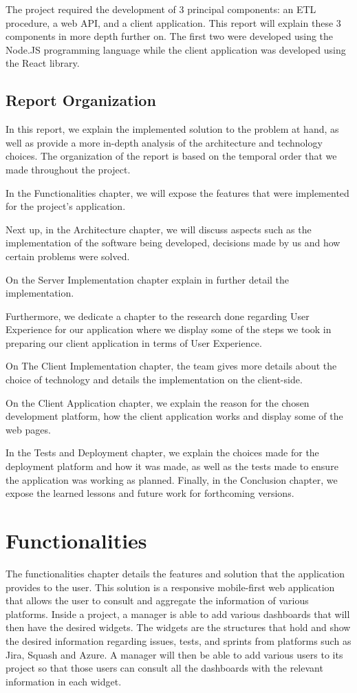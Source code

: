 \documentclass[a4paper,twoside,10pt]{report}
\begin{document}
The project required the development of 3 principal components: an ETL procedure, a web API, and a client application. This report will explain these 3 components in more depth further on.
The first two were developed using the Node.JS programming language while the client application was developed using the React library.

\section{Report Organization}
In this report, we explain the implemented solution to the problem at hand, as well as provide a more in-depth analysis of the architecture and technology choices. The organization of the report is based on the temporal order that we made throughout the project.

In the Functionalities chapter, we will expose the features that were implemented for the project's application.

Next up, in the Architecture chapter, we will discuss aspects such as the implementation of the software being developed, decisions made by us and how certain problems were solved.

On the Server Implementation chapter explain in further detail the implementation.

Furthermore, we dedicate a chapter to the research done regarding User Experience for our application where we display some of the steps we took in preparing our client application in terms of User Experience.

On The Client Implementation chapter, the team gives more details about the choice of technology and details the implementation on the client-side.

On the Client Application chapter, we explain the reason for the chosen development platform, how the client application works and display some of the web pages.  

In the Tests and Deployment chapter, we explain the choices made for the deployment platform and how it was made, as well as the tests made to ensure the application was working as planned. Finally, in the Conclusion chapter, we expose the learned lessons and future work for forthcoming versions.

\chapter{Functionalities}

The functionalities chapter details the features and solution that the application provides to the user. This solution is a responsive mobile-first web application that allows the user to consult and aggregate the information of various platforms. Inside a project, a manager is able to add various dashboards that will then have the desired widgets. The widgets are the structures that hold and show the desired information regarding issues, tests, and sprints from platforms such as Jira\cite{JIRA}, Squash\cite{SQUASH} and Azure\cite{AZURE}. A manager will then be able to add various users to its project so that those users can consult all the dashboards with the relevant information in each widget.
\end{document}
